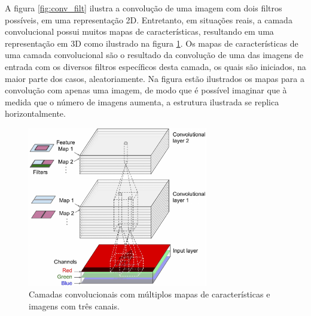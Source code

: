A figura \ref{fig:conv_filt} ilustra a convolução de uma imagem com dois filtros possíveis, em uma representação 2D.
Entretanto, em situações reais, a camada convolucional possui muitos mapas de características, resultando
em uma representação em 3D como ilustrado na figura \ref{fig:featmaps}. Os mapas de características
de uma camada convolucional são o resultado da convolução de uma das imagens de entrada com os diversos
filtros específicos desta camada, os quais são iniciados, na maior parte dos casos, aleatoriamente.
Na figura estão ilustrados os mapas para a convolução com apenas uma imagem, de modo que é possível
imaginar que à medida que o número de imagens aumenta, a estrutura ilustrada se replica horizontalmente. 
\begin{figure}[htp]
\begin{center}
  \includegraphics[width=0.7\textwidth]{fig/feat_maps}
  \caption{Camadas convolucionais com múltiplos mapas de características e imagens com três canais.}
  \label{fig:featmaps}
\end{center}
\end{figure}


